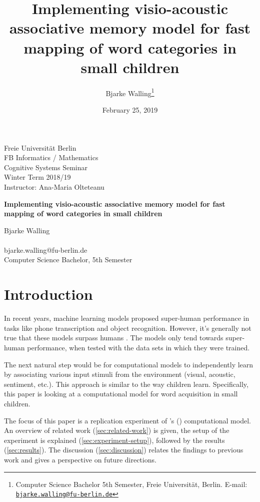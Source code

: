 \documentclass[twocolumn]{article}
\title{Implementing visio-acoustic associative memory model for fast mapping of word categories in small children}
\author{Bjarke Walling\thanks{Computer Science Bachelor 5th Semester, Freie Universität, Berlin. E-mail: \href{mailto:bjarke.walling@fu-berlin.de}{\texttt{bjarke.walling@fu-berlin.de}}}}
\date{February 25, 2019}
\begin{document}
\begin{titlepage}
\noindent
Freie Universität Berlin\\
FB Informatics / Mathematics\\
Cognitive Systems Seminar\\
Winter Term 2018/19\\
Instructor: Ana-Maria Olteteanu
\vspace{4.5cm}
\begin{center}
{\LARGE \textbf{Implementing visio-acoustic associative memory model for fast mapping of word categories in small children} \par}
\end{center}
\vspace{8.7cm}
\noindent
Bjarke Walling\\
\\
bjarke.walling@fu-berlin.de\\
Computer Science Bachelor, 5th Semester\\
\end{titlepage}
\maketitle

\section{Introduction} \label{sec:introduction}
In recent years, machine learning models proposed super-human performance in tasks like phone transcription and object recognition. However, it's generally not true that these models surpass humans \parencite{chang_seven_2019}. The models only tend towards super-human performance, when tested with the data sets in which they were trained.

The next natural step would be for computational models to independently learn by associating various input stimuli from the environment (visual, acoustic, sentiment, etc.). This approach is similar to the way children learn. Specifically, this paper is looking at a computational model for word acquisition in small children.

The focus of this paper is a replication experiment of \citeauthor{gliozzi_visual_2018}'s (\citeyear{gliozzi_visual_2018}) computational model. An overview of related work (\autoref{sec:related-work}) is given, the setup of the experiment is explained (\autoref{sec:experiment-setup}), followed by the results (\autoref{sec:results}). The discussion (\autoref{sec:discussion}) relates the findings to previous work and gives a perspective on future directions.
\end{document}
